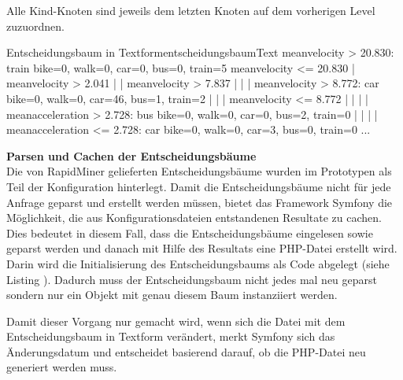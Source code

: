 Alle Kind-Knoten sind jeweils dem letzten Knoten auf dem vorherigen Level zuzuordnen.

\begin{code}[]{Entscheidungsbaum in Textform}{entscheidungsbaumText}
meanvelocity > 20.830: train {bike=0, walk=0, car=0, bus=0, train=5}
meanvelocity <= 20.830
|   meanvelocity > 2.041
|   |   meanvelocity > 7.837
|   |   |   meanvelocity > 8.772: car {bike=0, walk=0, car=46, bus=1, train=2}
|   |   |   meanvelocity <= 8.772
|   |   |   |   meanacceleration > 2.728: bus {bike=0, walk=0, car=0, bus=2, train=0}
|   |   |   |   meanacceleration <= 2.728: car {bike=0, walk=0, car=3, bus=0, train=0}
...
\end{code}

\textbf{Parsen und Cachen der Entscheidungsbäume} \\
\label{parsenCachenEntscheidungsbaum}
Die von RapidMiner gelieferten Entscheidungsbäume wurden im Prototypen als Teil der Konfiguration hinterlegt. Damit die Entscheidungsbäume nicht für jede Anfrage geparst und erstellt werden müssen, bietet das Framework Symfony die Möglichkeit, die aus Konfigurationsdateien entstandenen Resultate zu cachen. Dies bedeutet in diesem Fall, dass die Entscheidungsbäume eingelesen sowie geparst werden und danach mit Hilfe des Resultats eine PHP-Datei erstellt wird. Darin wird die Initialisierung des Entscheidungsbaums als Code abgelegt (siehe Listing ). Dadurch muss der Entscheidungsbaum nicht jedes mal neu geparst sondern nur ein Objekt mit genau diesem Baum instanziiert werden. 

\begin{code}[PHP]{Ausschnitt des generierten Entscheidungsbaums als PHP-Klasse}{entscheidungsbaumPHP}
...
class BasicDecisionTree implements DecisionTreeInterface
{
    protected $tree;

    function __construct()
    {
        $node0 = new Node();
        $node0->setDecision(new Decision('meanvelocity', '>', 20.83));
        $node1 = new Node();
        $node1->setResult(new Result(0,0,0,0,5));
        ...
        $node0->setRight($node2);
        $node1->setParent($node1);
        $node2->setParent($node0);
        $node2->setLeft($node3);
        ...
\end{code}

Damit dieser Vorgang nur gemacht wird, wenn sich die Datei mit dem Entscheidungsbaum in Textform verändert, merkt Symfony sich das Änderungsdatum und entscheidet basierend darauf, ob die PHP-Datei neu generiert werden muss.


